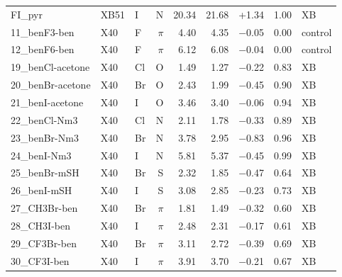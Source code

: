 {\begin{longtable}{lllrrrrrl}
FI\_pyr & XB51 & I & N & 20.34 & 21.68 & +1.34 & 1.00 & XB\\
11\_benF3-ben & X40 & F & $\pi$ & 4.40 & 4.35 & $-$0.05 & 0.00 & control\\
12\_benF6-ben & X40 & F & $\pi$ & 6.12 & 6.08 & $-$0.04 & 0.00 & control\\
19\_benCl-acetone & X40 & Cl & O & 1.49 & 1.27 & $-$0.22 & 0.83 & XB\\
20\_benBr-acetone & X40 & Br & O & 2.43 & 1.99 & $-$0.45 & 0.90 & XB\\
21\_benI-acetone & X40 & I & O & 3.46 & 3.40 & $-$0.06 & 0.94 & XB\\
22\_benCl-Nm3 & X40 & Cl & N & 2.11 & 1.78 & $-$0.33 & 0.89 & XB\\
23\_benBr-Nm3 & X40 & Br & N & 3.78 & 2.95 & $-$0.83 & 0.96 & XB\\
24\_benI-Nm3 & X40 & I & N & 5.81 & 5.37 & $-$0.45 & 0.99 & XB\\
25\_benBr-mSH & X40 & Br & S & 2.32 & 1.85 & $-$0.47 & 0.64 & XB\\
26\_benI-mSH & X40 & I & S & 3.08 & 2.85 & $-$0.23 & 0.73 & XB\\
27\_CH3Br-ben & X40 & Br & $\pi$ & 1.81 & 1.49 & $-$0.32 & 0.60 & XB\\
28\_CH3I-ben & X40 & I & $\pi$ & 2.48 & 2.31 & $-$0.17 & 0.61 & XB\\
29\_CF3Br-ben & X40 & Br & $\pi$ & 3.11 & 2.72 & $-$0.39 & 0.69 & XB\\
30\_CF3I-ben & X40 & I & $\pi$ & 3.91 & 3.70 & $-$0.21 & 0.67 & XB\\
\end{longtable}}
